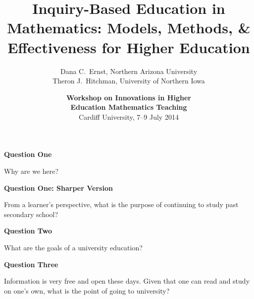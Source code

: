 \documentclass[10pt,handout]{beamer}
\begin{document}

\title[Inquiry-Based Education in Mathematics]
{\large \textbf{Inquiry-Based Education in Mathematics: Models, Methods, \& Effectiveness for Higher Education}}
\author[D.C.~Ernst and TJ Hitchman]{Dana C.~Ernst, Northern Arizona University\\
Theron J.~Hitchman, University of Northern Iowa}

\vspace{1em}

\date{\textbf{Workshop on Innovations in Higher\\ Education Mathematics Teaching}\\
Cardiff University, 7--9 July 2014}

\frame{\titlepage}


\begin{frame}{\textbf{Question One}}

\begin{center}{\Huge Why are we here?}\end{center}

\end{frame}

\begin{frame}{\textbf{Question One: Sharper Version}}

\begin{center}{\Huge From a learner's perspective, what is the purpose of continuing to study past secondary school?}\end{center}

\end{frame}

\begin{frame}{\textbf{Question Two}}

\begin{center}{\Huge What are the goals of a university education?}\end{center}

\end{frame}

\begin{frame}{\textbf{Question Three}}

\begin{center}{\Huge Information is very free and open these days. Given that one can read and study on one's own, what is the point of going to university?}\end{center}

\end{frame}
\end{document}
